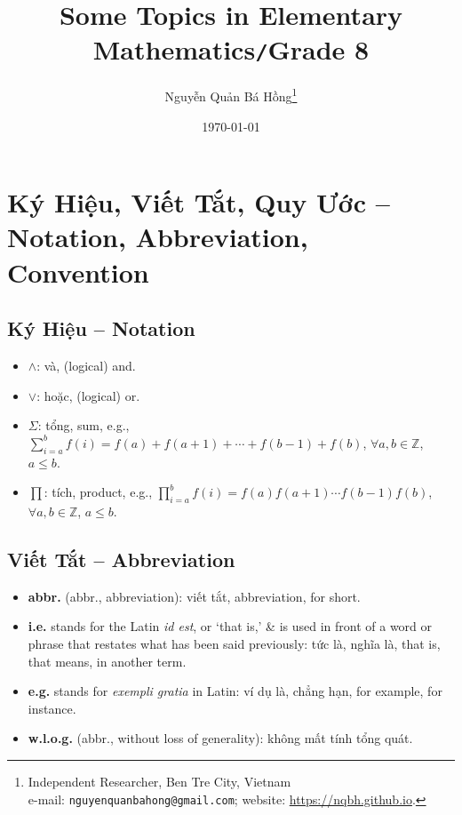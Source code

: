 \documentclass{article}
\title{Some Topics in Elementary Mathematics\texttt{/}Grade 8}
\author{Nguyễn Quản Bá Hồng\footnote{Independent Researcher, Ben Tre City, Vietnam\\e-mail: \texttt{nguyenquanbahong@gmail.com}; website: \url{https://nqbh.github.io}.}}
\date{\today}
\numberwithin{equation}{section}
\begin{document}
\maketitle
\setcounter{secnumdepth}{4}
\setcounter{tocdepth}{3}
\tableofcontents
\newpage


\section*{Ký Hiệu, Viết Tắt, Quy Ước -- Notation, Abbreviation, Convention}

\subsection*{Ký Hiệu -- Notation}
\begin{itemize}
	\item $\land$: và, (logical) and.
	\item $\lor$: hoặc, (logical) or.
	\item $\Sigma$: tổng, sum, e.g., $\sum_{i=a}^b f(i) = f(a) + f(a + 1) + \cdots + f(b - 1) + f(b)$, $\forall a,b\in\mathbb{Z}$, $a\le b$.
	\item $\prod$: tích, product, e.g., $\prod_{i=a}^b f(i) = f(a)f(a + 1)\cdots f(b - 1)f(b)$, $\forall a,b\in\mathbb{Z}$, $a\le b$.
\end{itemize}

\subsection*{Viết Tắt -- Abbreviation}
\begin{itemize}
	\item \textbf{abbr.} (abbr., abbreviation): viết tắt, abbreviation, for short.
	\item \textbf{i.e.} stands for the Latin \textit{id est}, or `that is,' \& is used in front of a word or phrase that restates what has been said previously: tức là, nghĩa là, that is, that means, in another term.
	\item \textbf{e.g.} stands for \textit{exempli gratia} in Latin: ví dụ là, chẳng hạn, for example, for instance.
	\item \textbf{w.l.o.g.} (abbr., without loss of generality): không mất tính tổng quát.
\end{itemize}
\end{document}
